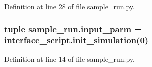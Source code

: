 Definition at line 28 of file sample\+\_\+run.\+py.

\hypertarget{namespacesample__run_a1725ba2fc9260075ad326ae3a89cc20f}{
\subsubsection[{input\+\_\+parm}]{\setlength{\rightskip}{0pt plus 5cm}tuple sample\+\_\+run.\+input\+\_\+parm = interface\+\_\+script.\+init\+\_\+simulation(0)}}\label{namespacesample__run_a1725ba2fc9260075ad326ae3a89cc20f}


Definition at line 14 of file sample\+\_\+run.\+py.

